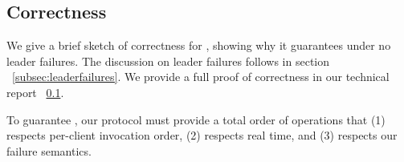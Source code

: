 

\subsection{Correctness}
We give a brief sketch of correctness for \protocol, showing why it guarantees \mdl under no leader failures. The discussion on leader failures follows in section ~\ref{subsec:leaderfailures}. We provide a full proof of correctness in our technical report ~\ref{}.

To guarantee \mdl, our protocol must provide a total order of operations that (1) respects per-client invocation order, (2) respects real time, and (3) respects our failure semantics. 

